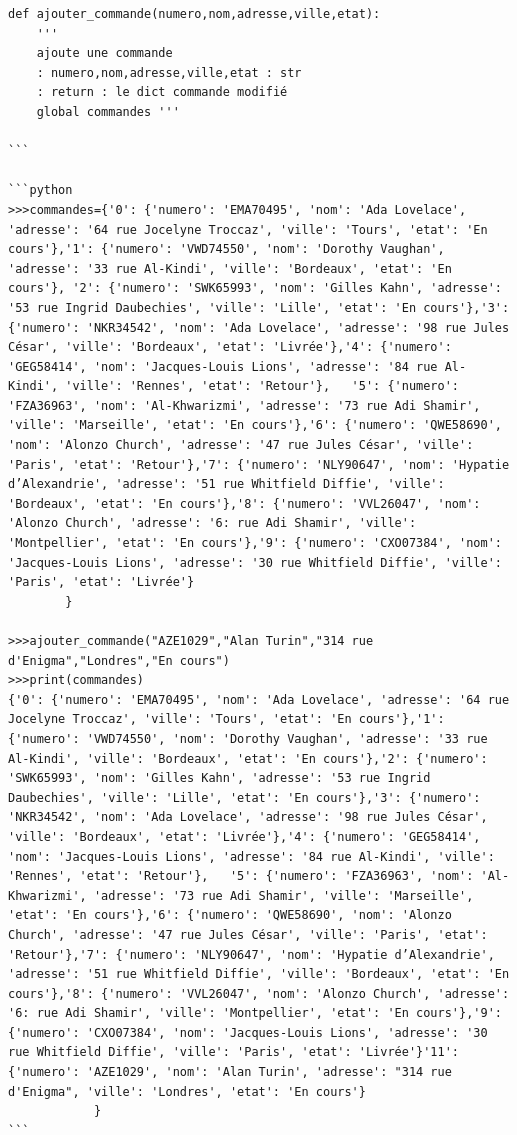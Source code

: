 \documentclass[
]{article}
\begin{document}
\begin{verbatim}
def ajouter_commande(numero,nom,adresse,ville,etat):
    '''
    ajoute une commande
    : numero,nom,adresse,ville,etat : str
    : return : le dict commande modifié
    global commandes '''

```

```python
>>>commandes={'0': {'numero': 'EMA70495', 'nom': 'Ada Lovelace', 'adresse': '64 rue Jocelyne Troccaz', 'ville': 'Tours', 'etat': 'En cours'},'1': {'numero': 'VWD74550', 'nom': 'Dorothy Vaughan', 'adresse': '33 rue Al-Kindi', 'ville': 'Bordeaux', 'etat': 'En cours'}, '2': {'numero': 'SWK65993', 'nom': 'Gilles Kahn', 'adresse': '53 rue Ingrid Daubechies', 'ville': 'Lille', 'etat': 'En cours'},'3': {'numero': 'NKR34542', 'nom': 'Ada Lovelace', 'adresse': '98 rue Jules César', 'ville': 'Bordeaux', 'etat': 'Livrée'},'4': {'numero': 'GEG58414', 'nom': 'Jacques-Louis Lions', 'adresse': '84 rue Al-Kindi', 'ville': 'Rennes', 'etat': 'Retour'},   '5': {'numero': 'FZA36963', 'nom': 'Al-Khwarizmi', 'adresse': '73 rue Adi Shamir', 'ville': 'Marseille', 'etat': 'En cours'},'6': {'numero': 'QWE58690', 'nom': 'Alonzo Church', 'adresse': '47 rue Jules César', 'ville': 'Paris', 'etat': 'Retour'},'7': {'numero': 'NLY90647', 'nom': 'Hypatie d’Alexandrie', 'adresse': '51 rue Whitfield Diffie', 'ville': 'Bordeaux', 'etat': 'En cours'},'8': {'numero': 'VVL26047', 'nom': 'Alonzo Church', 'adresse': '6: rue Adi Shamir', 'ville': 'Montpellier', 'etat': 'En cours'},'9': {'numero': 'CXO07384', 'nom': 'Jacques-Louis Lions', 'adresse': '30 rue Whitfield Diffie', 'ville': 'Paris', 'etat': 'Livrée'}
        }

>>>ajouter_commande("AZE1029","Alan Turin","314 rue d'Enigma","Londres","En cours")
>>>print(commandes)   
{'0': {'numero': 'EMA70495', 'nom': 'Ada Lovelace', 'adresse': '64 rue Jocelyne Troccaz', 'ville': 'Tours', 'etat': 'En cours'},'1': {'numero': 'VWD74550', 'nom': 'Dorothy Vaughan', 'adresse': '33 rue Al-Kindi', 'ville': 'Bordeaux', 'etat': 'En cours'},'2': {'numero': 'SWK65993', 'nom': 'Gilles Kahn', 'adresse': '53 rue Ingrid Daubechies', 'ville': 'Lille', 'etat': 'En cours'},'3': {'numero': 'NKR34542', 'nom': 'Ada Lovelace', 'adresse': '98 rue Jules César', 'ville': 'Bordeaux', 'etat': 'Livrée'},'4': {'numero': 'GEG58414', 'nom': 'Jacques-Louis Lions', 'adresse': '84 rue Al-Kindi', 'ville': 'Rennes', 'etat': 'Retour'},   '5': {'numero': 'FZA36963', 'nom': 'Al-Khwarizmi', 'adresse': '73 rue Adi Shamir', 'ville': 'Marseille', 'etat': 'En cours'},'6': {'numero': 'QWE58690', 'nom': 'Alonzo Church', 'adresse': '47 rue Jules César', 'ville': 'Paris', 'etat': 'Retour'},'7': {'numero': 'NLY90647', 'nom': 'Hypatie d’Alexandrie', 'adresse': '51 rue Whitfield Diffie', 'ville': 'Bordeaux', 'etat': 'En cours'},'8': {'numero': 'VVL26047', 'nom': 'Alonzo Church', 'adresse': '6: rue Adi Shamir', 'ville': 'Montpellier', 'etat': 'En cours'},'9': {'numero': 'CXO07384', 'nom': 'Jacques-Louis Lions', 'adresse': '30 rue Whitfield Diffie', 'ville': 'Paris', 'etat': 'Livrée'}'11': {'numero': 'AZE1029', 'nom': 'Alan Turin', 'adresse': "314 rue d'Enigma", 'ville': 'Londres', 'etat': 'En cours'}
            }
```



\end{verbatim}
\end{document}
